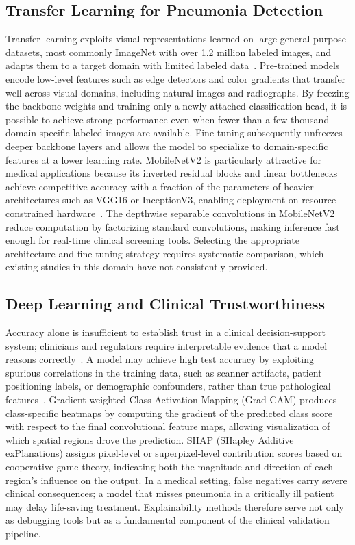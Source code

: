 \documentclass[preprint,12pt]{elsarticle}
\begin{document}
\subsection{Transfer Learning for Pneumonia Detection}
Transfer learning exploits visual representations learned on large
general-purpose datasets, most commonly ImageNet with over 1.2 million
labeled images, and adapts them to a target domain with limited
labeled data~\cite{liang2020}.
Pre-trained models encode low-level features such as edge detectors and
color gradients that transfer well across visual domains, including
natural images and radiographs.
By freezing the backbone weights and training only a newly attached
classification head, it is possible to achieve strong performance even
when fewer than a few thousand domain-specific labeled images are
available.
Fine-tuning subsequently unfreezes deeper backbone layers and allows
the model to specialize to domain-specific features at a lower learning
rate.
MobileNetV2 is particularly attractive for medical applications because
its inverted residual blocks and linear bottlenecks achieve competitive
accuracy with a fraction of the parameters of heavier architectures
such as VGG16 or InceptionV3, enabling deployment on
resource-constrained hardware~\cite{mobilenetv2}.
The depthwise separable convolutions in MobileNetV2 reduce computation
by factorizing standard convolutions, making inference fast enough for
real-time clinical screening tools.
Selecting the appropriate architecture and fine-tuning strategy
requires systematic comparison, which existing studies in this domain
have not consistently provided.

\subsection{Deep Learning and Clinical Trustworthiness}
Accuracy alone is insufficient to establish trust in a clinical
decision-support system; clinicians and regulators require
interpretable evidence that a model reasons correctly~\cite{reshan2023}.
A model may achieve high test accuracy by exploiting spurious
correlations in the training data, such as scanner artifacts, patient
positioning labels, or demographic confounders, rather than true
pathological features~\cite{chouhan2020}.
Gradient-weighted Class Activation Mapping (Grad-CAM) produces
class-specific heatmaps by computing the gradient of the predicted
class score with respect to the final convolutional feature maps,
allowing visualization of which spatial regions drove the prediction.
SHAP (SHapley Additive exPlanations) assigns pixel-level or
superpixel-level contribution scores based on cooperative game theory,
indicating both the magnitude and direction of each region's influence
on the output.
In a medical setting, false negatives carry severe clinical
consequences; a model that misses pneumonia in a critically ill patient
may delay life-saving treatment.
Explainability methods therefore serve not only as debugging tools but
as a fundamental component of the clinical validation pipeline.
\end{document}

